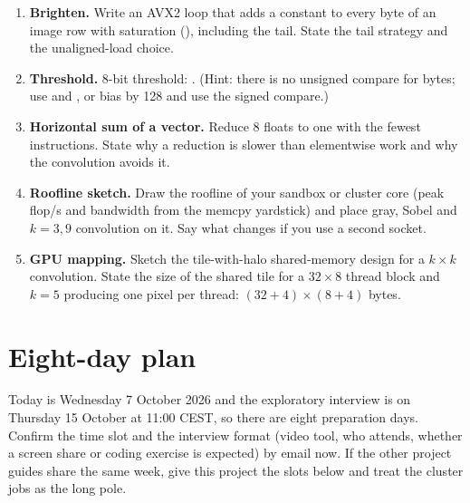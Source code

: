\begin{enumerate}[leftmargin=*,itemsep=6pt]
\item \textbf{Brighten.} Write an AVX2 loop that adds a constant to every byte of an image row with saturation (), including the tail. State the tail strategy and the unaligned-load choice.
\item \textbf{Threshold.} 8-bit threshold: . (Hint: there is no unsigned compare for bytes; use  and , or bias by 128 and use the signed compare.)
\item \textbf{Horizontal sum of a vector.} Reduce 8 floats to one with the fewest instructions. State why a reduction is slower than elementwise work and why the convolution avoids it.
\item \textbf{Roofline sketch.} Draw the roofline of your sandbox or cluster core (peak flop/s and bandwidth from the memcpy yardstick) and place gray, Sobel and $k=3,9$ convolution on it. Say what changes if you use a second socket.
\item \textbf{GPU mapping.} Sketch the tile-with-halo shared-memory design for a $k\times k$ convolution. State the size of the shared tile for a $32\times8$ thread block and $k=5$ producing one pixel per thread: $(32+4)\times(8+4)$ bytes.
\end{enumerate}

\section{Eight-day plan}

Today is Wednesday 7 October 2026 and the exploratory interview is on Thursday 15 October at 11:00 CEST, so there are eight preparation days. Confirm the time slot and the interview format (video tool, who attends, whether a screen share or coding exercise is expected) by email now. If the other project guides share the same week, give this project the slots below and treat the cluster jobs as the long pole.

